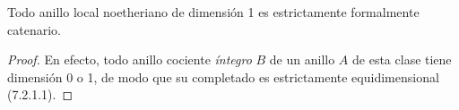 \begin{corollary}[7.2.9]
Todo anillo local noetheriano de dimensión 1 es estrictamente
formalmente catenario.
\end{corollary}

\begin{proof}
En efecto, todo anillo cociente \emph{íntegro} $B$ de un anillo $A$ de esta
clase tiene dimensión 0 o 1, de modo que su completado es
estrictamente equidimensional (7.2.1.1).
\end{proof}
